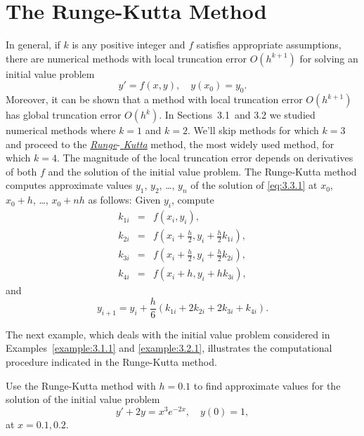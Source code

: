 \section{The Runge-Kutta Method}

\noindent
In general, if $k$ is any positive integer and $f$ satisfies appropriate assumptions, there are
numerical methods with local truncation error $O(h^{k+1})$ for solving an initial value problem
\begin{equation}
  \label{eq:3.3.1}y'=f(x,y),\quad y(x_{0})=y_{0}.
\end{equation}
Moreover, it can be shown that a method with local truncation error $O(h^{k+1})$ has global
truncation error $O(h^{k})$. In Sections~3.1\ and 3.2 we studied numerical methods where $k=1$ and
$k=2$. We'll skip methods for which $k=3$ and proceed to the
\href{https://mathshistory.st-andrews.ac.uk/Biographies/Runge/}{\color{blue}
\it Runge}-\href{https://mathshistory.st-andrews.ac.uk/Biographies/Kutta/}{\it
\color{blue}
Kutta\/}
method, the most widely used method, for which $k=4$. The magnitude of the local truncation error
depends on derivatives of both $f$ and the solution of the initial value problem.
\enlargethispage{1in}
The Runge-Kutta method computes approximate values $y_{1}$, $y_{2}$, \dots, $y_{n}$ of the solution
of \eqref{eq:3.3.1} at $x_{0}$, $x_{0}+h$, \dots, $x_{0}+nh$ as follows: Given $y_{i}$, compute
\begin{eqnarray*}
  k_{1i} & = & f(x_{i},y_{i}),                                          \\
  k_{2i} & = & f\left(x_{i}+\frac{h}{2},y_{i}+\frac{h}{2}k_{1i}\right), \\
  k_{3i} & = & f\left(x_{i}+\frac{h}{2},y_{i}+\frac{h}{2}k_{2i}\right), \\
  k_{4i} & = & f(x_{i}+h,y_{i}+hk_{3i}),
\end{eqnarray*}
and
\[
  y_{i+1}=y_{i}+\frac{h}{6}(k_{1i}+2k_{2i}+2k_{3i}+k_{4i}).
\]

The next example, which deals with the initial value problem considered in
Examples~\ref{example:3.1.1} and \ref{example:3.2.1}, illustrates the computational procedure
indicated in the Runge-Kutta method.

\begin{example}
  \label{example:3.3.1} \rm Use the Runge-Kutta method with $h=0.1$ to find approximate values for
  the solution of the initial value problem
  \begin{equation}
    \label{eq:3.3.2}y'+2y=x^{3}e^{-2x},\quad y(0)=1,
  \end{equation}
  at $x=0.1,0.2$.
\end{example}

